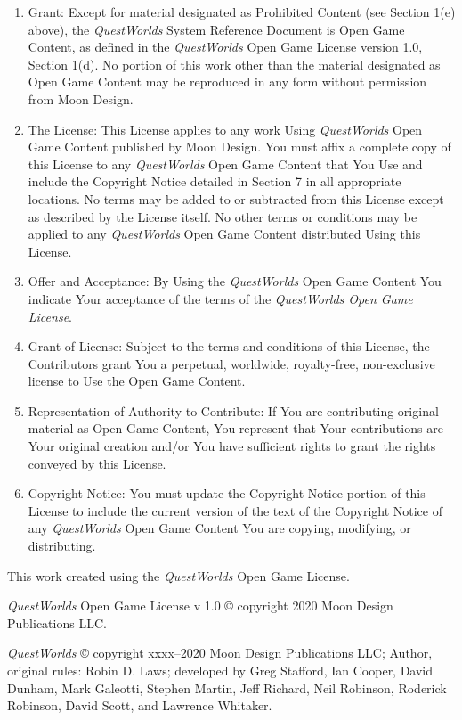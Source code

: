 \documentclass[
]{article}
\begin{document}
\begin{enumerate}
\def\labelenumi{\arabic{enumi}.}
\setcounter{enumi}{1}
\item
  Grant: Except for material designated as Prohibited Content (see
  Section 1(e) above), the \emph{QuestWorlds} System Reference Document
  is Open Game Content, as defined in the \emph{QuestWorlds} Open Game
  License version 1.0, Section 1(d). No portion of this work other than
  the material designated as Open Game Content may be reproduced in any
  form without permission from Moon Design.
\item
  The License: This License applies to any work Using \emph{QuestWorlds}
  Open Game Content published by Moon Design. You must affix a complete
  copy of this License to any \emph{QuestWorlds} Open Game Content that
  You Use and include the Copyright Notice detailed in Section 7 in all
  appropriate locations. No terms may be added to or subtracted from
  this License except as described by the License itself. No other terms
  or conditions may be applied to any \emph{QuestWorlds} Open Game
  Content distributed Using this License.
\item
  Offer and Acceptance: By Using the \emph{QuestWorlds} Open Game
  Content You indicate Your acceptance of the terms of the
  \emph{QuestWorlds Open Game License}.
\item
  Grant of License: Subject to the terms and conditions of this License,
  the Contributors grant You a perpetual, worldwide, royalty-free,
  non-exclusive license to Use the Open Game Content.
\item
  Representation of Authority to Contribute: If You are contributing
  original material as Open Game Content, You represent that Your
  contributions are Your original creation and/or You have sufficient
  rights to grant the rights conveyed by this License.
\item
  Copyright Notice: You must update the Copyright Notice portion of this
  License to include the current version of the text of the Copyright
  Notice of any \emph{QuestWorlds} Open Game Content You are copying,
  modifying, or distributing.
\end{enumerate}

This work created using the \emph{QuestWorlds} Open Game License.

\emph{QuestWorlds} Open Game License v 1.0 © copyright 2020 Moon Design
Publications LLC.

\emph{QuestWorlds} © copyright xxxx--2020 Moon Design Publications LLC;
Author, original rules: Robin D. Laws; developed by Greg Stafford, Ian
Cooper, David Dunham, Mark Galeotti, Stephen Martin, Jeff Richard, Neil
Robinson, Roderick Robinson, David Scott, and Lawrence Whitaker.
\end{document}
